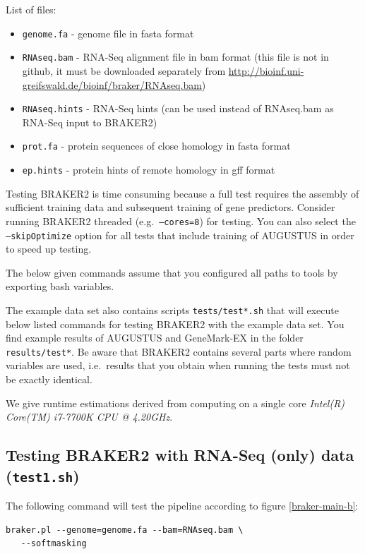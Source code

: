 \documentclass[]{article}
\begin{document}
List of files:

\begin{itemize}
\item
  \texttt{genome.fa} - genome file in fasta format
\item
  \texttt{RNAseq.bam} - RNA-Seq alignment file in bam format (this file
  is not in github, it must be downloaded separately from
  \url{http://bioinf.uni-greifswald.de/bioinf/braker/RNAseq.bam})
\item
  \texttt{RNAseq.hints} - RNA-Seq hints (can be used instead of
  RNAseq.bam as RNA-Seq input to BRAKER2)
\item
  \texttt{prot.fa} - protein sequences of close homology in fasta format
\item
  \texttt{ep.hints} - protein hints of remote homology in gff format
\end{itemize}

Testing BRAKER2 is time consuming because a full test requires the
assembly of sufficient training data and subsequent training of gene
predictors. Consider running BRAKER2 threaded (e.g.~\texttt{–cores=8})
for testing. You can also select the \texttt{–skipOptimize} option for
all tests that include training of AUGUSTUS in order to speed up
testing.

The below given commands assume that you configured all paths to tools
by exporting bash variables.

The example data set also contains scripts \texttt{tests/test*.sh} that
will execute below listed commands for testing BRAKER2 with the example
data set. You find example results of AUGUSTUS and GeneMark-EX in the
folder \texttt{results/test*}. Be aware that BRAKER2 contains several
parts where random variables are used, i.e.~results that you obtain when
running the tests must not be exactly identical.

We give runtime estimations derived from computing on a single core
\emph{Intel(R) Core(TM) i7-7700K CPU @ 4.20GHz}.

\subsection{Testing BRAKER2 with RNA-Seq (only) data (\texttt{test1.sh})}\label{testing-braker2-with-rna-seq-only-data-test1.sh}

The following command will test the pipeline according to figure
\ref{braker-main-b}:

\begin{verbatim}
braker.pl --genome=genome.fa --bam=RNAseq.bam \
   --softmasking
\end{verbatim}
\end{document}
